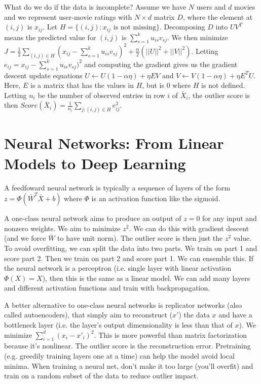 \documentclass[a4paper]{article}
\begin{document}
What do we do if the data is incomplete? Assume we have $N$ users and $d$ movies
and we represent user-movie ratings with $N \times d$ matrix $D$, where the
element at $(i, j)$ is $x_{ij}$. Let $H = \{(i, j) : x_{ij} \textrm{ is not
missing}\}$. Decomposing $D$ into $UV^T$ means the predicted value for $(i, j)$
is $\sum_{s=1}^{k}{u_{is} v_{sj}}$. We then minimize $J = \frac{1}{2}
\sum_{(i, j) \in H}{(x_{ij} - \sum_{s=1}^{k}{u_{is} v_{sj}})^2}
+ \frac{\alpha}{2}(||U||^2 + ||V||^2)$. Letting $e_{ij} = x_{ij} -
\sum_{s=1}^{k}{u_{is} v_{sj}})^2$ and computing the gradient gives us the
gradient descent update equations $U \gets U(1- \alpha \eta) + \eta EV$
and $V \gets V(1 - \alpha \eta) + \eta E^T U$. Here, $E$ is a matrix that has
the values in $H$, but is $0$ where $H$ is not defined. Letting $n_i$ be the
number of observed entries in row $i$ of $\bar{X}_i$, the outlier score is
then $Score(\bar{X}_i) = \frac{1}{n_i} \sum_{j:(i, j) \in H}{e_{ij}^2}$.


\section{Neural Networks: From Linear Models to Deep Learning}
A feedfoward neural network is typically a sequence of layers of the form
$z = \Phi(\bar{W}^T \bar{X} + b)$ where $\Phi$ is an activation function like
the sigmoid.

A one-class neural network aims to produce an output of $z = 0$ for any input
and nonzero weights. We aim to minimize $z^2$. We can do this with gradient
descent (and we force $\bar{W}$ to have unit norm). The outlier score is
then just the $z^2$ value. To avoid overfitting, we can split the data into
two parts. We train on part 1 and score part 2. Then we train on part 2 and
score part 1. We can ensemble this. If the neural network is a perceptron
(i.e. single layer with linear activation $\Phi(X) = X$), then this is the
same as a linear model. We can add many layers and different activation
functions and train with backpropagation.

A better alternative to one-class neural networks is replicator networks
(also called autoencoders), that simply aim to reconstruct ($x'$) the data $x$
and have a bottleneck layer (i.e. the layer's output dimensionality is less
than that of $x$). We minimize $\sum_{i=1}^{d}{(x_i - x'_i)^2}$. This is
more powerful than matrix factorization because it's nonlinear. The outlier
score is the reconstruction error. Pretraining (e.g. greedily training layers
one at a time) can help the model avoid local minima. When training a neural
net, don't make it too large (you'll overfit) and train on a random subset
of the data to reduce outlier impact.
\end{document}
